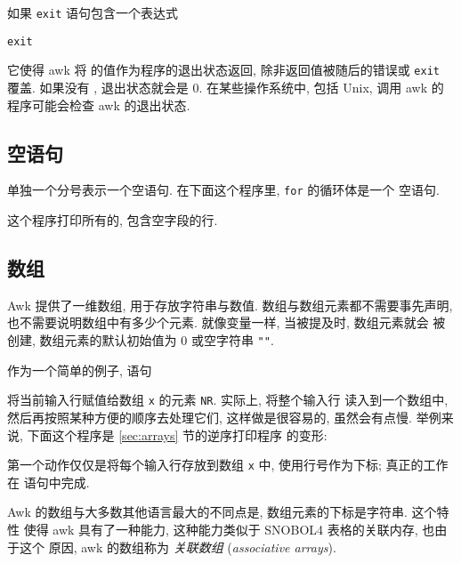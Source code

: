如果 \verb'exit' 语句包含一个表达式
\begin{pattern}
    \verb'exit' \expr
\end{pattern}
它使得 awk 将 \expr 的值作为程序的退出状态返回, 除非返回值被随后的错误或
\verb'exit' 覆盖. 如果没有 \expr, 退出状态就会是 0. 在某些操作系统中, 包括
Unix, 调用 awk 的程序可能会检查  awk 的退出状态.

\subsection{空语句}
\label{subsec:empty_statement}

单独一个分号表示一个空语句. 在下面这个程序里, \verb'for' 的循环体是一个
空语句.
这个程序打印所有的, 包含空字段的行.

\subsection{数组}
\label{subsec:arrays}

Awk 提供了一维数组, 用于存放字符串与数值. 数组与数组元素都不需要事先声明,
也不需要说明数组中有多少个元素. 就像变量一样, 当被提及时, 数组元素就会
被创建, 数组元素的默认初始值为 0 或空字符串
\verb'""'.

作为一个简单的例子, 语句
将当前输入行赋值给数组 \verb'x' 的元素 \verb'NR'. 实际上, 将整个输入行
读入到一个数组中, 然后再按照某种方便的顺序去处理它们, 这样做是很容易的,
虽然会有点慢. 举例来说, 下面这个程序是 \ref{sec:arrays} 节的逆序打印程序
的变形:
第一个动作仅仅是将每个输入行存放到数组 \verb'x' 中, 使用行号作为下标;
真正的工作在 \END 语句中完成.

Awk 的数组与大多数其他语言最大的不同点是, 数组元素的下标是字符串. 这个特性
使得 awk 具有了一种能力, 这种能力类似于 SNOBOL4 表格的关联内存, 也由于这个
原因, awk 的数组称为 \emph{关联数组} (\emph{associative arrays}).

